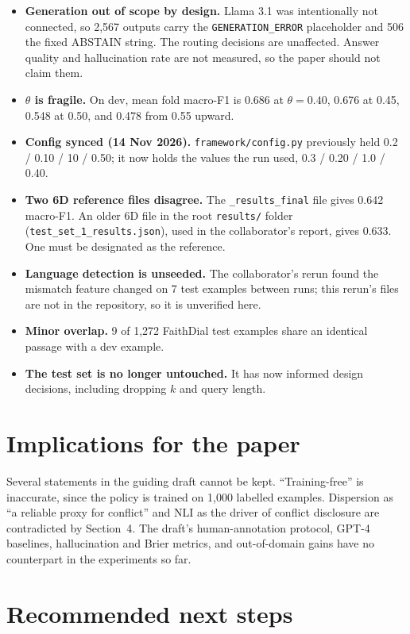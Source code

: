 \documentclass[10pt,a4paper]{article}
\newcommand{\code}[1]{\texttt{\small #1}}
\begin{document}
\begin{itemize}
\item \textbf{Generation out of scope by design.} Llama 3.1 was intentionally not connected, so
  2{,}567 outputs carry the \code{GENERATION\_ERROR} placeholder and 506 the fixed ABSTAIN string.
  The routing decisions are unaffected. Answer quality and hallucination rate are not measured,
  so the paper should not claim them.
\item \textbf{$\theta$ is fragile.} On dev, mean fold macro-F1 is 0.686 at $\theta{=}0.40$,
  0.676 at 0.45, 0.548 at 0.50, and 0.478 from 0.55 upward.
\item \textbf{Config synced (14 Nov 2026).} \code{framework/config.py} previously held
  0.2 / 0.10 / 10 / 0.50; it now holds the values the run used, 0.3 / 0.20 / 1.0 / 0.40.
\item \textbf{Two 6D reference files disagree.} The \code{\_results\_final} file gives 0.642
  macro-F1. An older 6D file in the root \code{results/} folder
  (\code{test\_set\_1\_results.json}), used in the collaborator's report, gives 0.633. One must
  be designated as the reference.
\item \textbf{Language detection is unseeded.} The collaborator's rerun found the mismatch feature
  changed on 7 test examples between runs; this rerun's files are not in the repository, so it
  is unverified here.
\item \textbf{Minor overlap.} 9 of 1{,}272 FaithDial test examples share an identical passage with
  a dev example.
\item \textbf{The test set is no longer untouched.} It has now informed design decisions,
  including dropping $k$ and query length.
\end{itemize}

\section{Implications for the paper}

Several statements in the guiding draft cannot be kept. ``Training-free'' is inaccurate, since
the policy is trained on 1{,}000 labelled examples. Dispersion as ``a reliable proxy for conflict''
and NLI as the driver of conflict disclosure are contradicted by Section~4. The draft's
human-annotation protocol, GPT-4 baselines, hallucination and Brier metrics, and out-of-domain
gains have no counterpart in the experiments so far.

\section{Recommended next steps}
\end{document}
